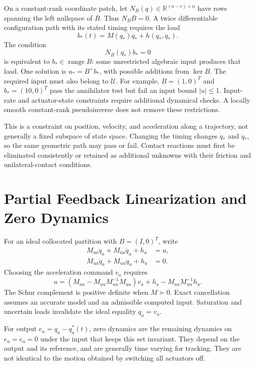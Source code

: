 \documentclass[12pt, openany]{book}
\theoremstyle{plain}
\begin{document}
On a constant-rank coordinate patch, let $N_B(q)\in\mathbb R^{(n-r)\times n}$
have rows spanning the left nullspace of $B$. Thus $N_BB=0$. A twice
differentiable configuration path with its stated timing requires the load
\begin{equation}
b_*(t)=M(q_*)\ddot q_*+h(q_*,\dot q_*).
\end{equation}
The condition
\begin{equation}
N_B(q_*)b_*=0
\label{eq:unactuated_dynamics}
\end{equation}
is equivalent to $b_*\in\operatorname{range}B$: some unrestricted algebraic
input produces that load. One solution is $u_*=B^+b_*$, with possible additions
from $\ker B$. The required input must also belong to $\mathcal U$.
For example, $B=(1,0)^T$ and $b_*=(10,0)^T$ pass the annihilator test but fail
an input bound $|u|\leq1$. Input-rate and actuator-state constraints require
additional dynamical checks. A locally smooth constant-rank pseudoinverse does
not remove these restrictions.

This is a constraint on position, velocity, and acceleration along a trajectory,
not generally a fixed subspace of state space. Changing the timing changes
$\dot q_*$ and $\ddot q_*$, so the same geometric path may pass or fail.
Contact reactions must first be eliminated consistently or retained as additional
unknowns with their friction and unilateral-contact conditions.

\section{Partial Feedback Linearization and Zero Dynamics}

For an ideal collocated partition with $B=(I,0)^T$, write
\begin{align}
M_{aa}\ddot q_a+M_{au}\ddot q_u+h_a&=u,\\
M_{ua}\ddot q_a+M_{uu}\ddot q_u+h_u&=0.
\end{align}
Choosing the acceleration command $v_a$ requires
\begin{equation}
u=(M_{aa}-M_{au}M_{uu}^{-1}M_{ua})v_a
  +h_a-M_{au}M_{uu}^{-1}h_u.
\end{equation}
The Schur complement is positive definite when $M\succ0$. Exact cancellation
assumes an accurate model and an admissible computed input. Saturation and
uncertain loads invalidate the ideal equality $\ddot q_a=v_a$.

For output $e_a=q_a-q_a^*(t)$, zero dynamics are the remaining dynamics on
$e_a=\dot e_a=0$ under the input that keeps this set invariant. They depend on
the output and its reference, and are generally time varying for tracking.
They are not identical to the motion obtained by switching all actuators off.
\end{document}
